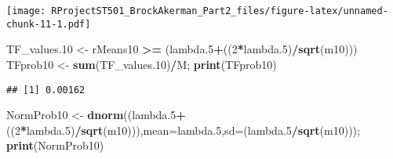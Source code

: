\documentclass[
]{article}
\newenvironment{Shaded}{\begin{snugshade}}{\end{snugshade}}
\newcommand{\DataTypeTok}[1]{\textcolor[rgb]{0.13,0.29,0.53}{#1}}
\newcommand{\DecValTok}[1]{\textcolor[rgb]{0.00,0.00,0.81}{#1}}
\newcommand{\FloatTok}[1]{\textcolor[rgb]{0.00,0.00,0.81}{#1}}
\newcommand{\KeywordTok}[1]{\textcolor[rgb]{0.13,0.29,0.53}{\textbf{#1}}}
\newcommand{\NormalTok}[1]{#1}
\newcommand{\OperatorTok}[1]{\textcolor[rgb]{0.81,0.36,0.00}{\textbf{#1}}}
\newcommand{\OtherTok}[1]{\textcolor[rgb]{0.56,0.35,0.01}{#1}}
\newcommand{\StringTok}[1]{\textcolor[rgb]{0.31,0.60,0.02}{#1}}
\begin{document}
\begin{Shaded}
\end{Shaded}

\texttt{[image: RProjectST501\_BrockAkerman\_Part2\_files/figure-latex/unnamed-chunk-11-1.pdf]}

\begin{Shaded}
\begin{Highlighting}[]
\NormalTok{TF_values}\FloatTok{.10}\NormalTok{ <-}\StringTok{ }\NormalTok{rMeans10 }\OperatorTok{>=}\StringTok{ }\NormalTok{(lambda}\FloatTok{.5}\OperatorTok{+}\NormalTok{((}\DecValTok{2}\OperatorTok{*}\NormalTok{lambda}\FloatTok{.5}\NormalTok{)}\OperatorTok{/}\KeywordTok{sqrt}\NormalTok{(m10)))}
\NormalTok{TFprob10 <-}\StringTok{ }\KeywordTok{sum}\NormalTok{(TF_values}\FloatTok{.10}\NormalTok{)}\OperatorTok{/}\NormalTok{M; }\KeywordTok{print}\NormalTok{(TFprob10)}
\end{Highlighting}
\end{Shaded}

\begin{verbatim}
## [1] 0.00162
\end{verbatim}

\begin{Shaded}
\begin{Highlighting}[]
\NormalTok{NormProb10 <-}\StringTok{ }\KeywordTok{dnorm}\NormalTok{((lambda}\FloatTok{.5}\OperatorTok{+}\NormalTok{((}\DecValTok{2}\OperatorTok{*}\NormalTok{lambda}\FloatTok{.5}\NormalTok{)}\OperatorTok{/}\KeywordTok{sqrt}\NormalTok{(m10))),}\DataTypeTok{mean=}\NormalTok{lambda}\FloatTok{.5}\NormalTok{,}\DataTypeTok{sd=}\NormalTok{(lambda}\FloatTok{.5}\OperatorTok{/}\KeywordTok{sqrt}\NormalTok{(m10))); }\KeywordTok{print}\NormalTok{(NormProb10)}
\end{Highlighting}
\end{Shaded}
\end{document}
